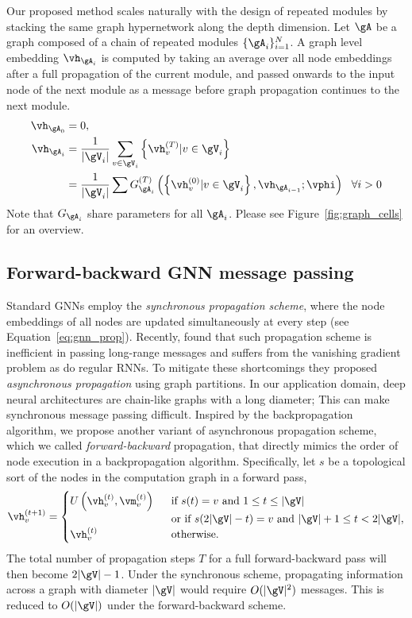 \documentclass{article} %
\begin{document}
Our proposed method scales naturally with the design of repeated modules by stacking the same graph
hypernetwork along the depth dimension. Let $\gA$ be a graph composed of a chain of repeated modules
$\{\gA_i\}_{i=1}^N$. A graph level embedding $\vh_{\gA_i}$ is computed by taking an average over all
node embeddings after a full propagation of the current module, and passed onwards to the input node
of the next module as a message before graph propagation continues to the next module.
\begin{align}
\vh_{\gA_0} &= 0,\\
\vh_{\gA_i} &= \frac{1}{|\gV_i|}\sum_{v\in \gV_i} \left\{\vh_v^{(T)} | v \in \gV_i \right\} \label{eq:agg}\\
            &= \frac{1}{|\gV_i|}\sum G_{\gA_i}^{(T)}\left(\left\{\vh_v^{(0)} | v \in \gV_i \right\}, \vh_{\gA_{i-1}}; \vphi\right) \ \ \forall i > 0 \label{eq:next_cell}
\end{align}
Note that $G_{\gA_i}$ share parameters for all $\gA_i$.  Please see Figure~\ref{fig:graph_cells} for an overview.

\subsection{Forward-backward GNN message passing}\label{sec:prop_scheme}
Standard GNNs employ the \textit{synchronous propagation scheme}\citep{li2015gated}, where the node
embeddings of all nodes are updated simultaneously at every step (see Equation~\ref{eq:gnn_prop}).
Recently, \cite{liao2018graph} found that such propagation scheme is inefficient in passing
long-range messages and suffers from the vanishing gradient problem as do regular RNNs. To mitigate
these shortcomings they proposed \textit{asynchronous propagation} using graph partitions. In our
application domain, deep neural architectures are chain-like graphs with a long diameter; This can
make synchronous message passing difficult. Inspired by the backpropagation algorithm, we propose
another variant of asynchronous propagation scheme, which we called \textit{forward-backward}
propagation, that directly mimics the order of node execution in a backpropagation algorithm.
Specifically, let $s$ be a topological sort of the nodes in the computation graph in a forward pass,
\begin{equation}
\label{eq:gnn_prop2}
\vh_v^{(t+1)} = 
\begin{cases}
U \left(\vh_v^{(t)}, \vm_v^{(t)} \right) \ \ & \text{if } s(t) = v \text{ and } 1 \le t \le |\gV|\\
  \ \ & \text{or if } s(2|\gV| - t) = v \text{ and } |\gV| + 1 \le t < 2|\gV|,\\
\vh_v^{(t)} \ \ & \text{otherwise}.
\end{cases}
\end{equation}
The total number of propagation steps $T$ for a full forward-backward pass will then become $2|\gV|-1$. Under the synchronous scheme,  propagating information across a graph with diameter $|\gV|$ would require $O(|\gV|^2)$ messages. This is reduced to $O(|\gV|)$ under the forward-backward scheme.
\end{document}
